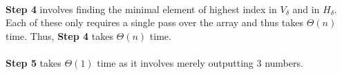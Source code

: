 \documentclass[]{article}
\begin{document}
		\paragraph{}
		\textbf{Step 4} involves finding the minimal element of highest index in $V_\delta$ and in $H_\delta$. Each of these only requires a single pass over the array and thus takes $\Theta(n)$ time. Thus, \textbf{Step 4} takes $\Theta(n)$ time.
		
		\paragraph{}
		\textbf{Step 5} takes $\Theta(1)$ time as it involves merely outputting 3 numbers.
	
	
\end{document}
